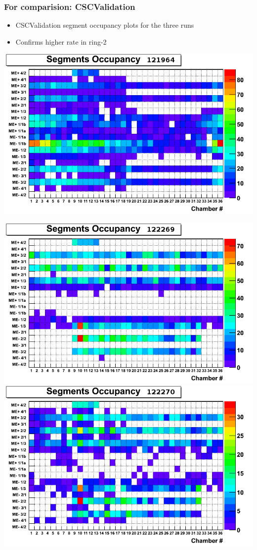 \documentclass[compress]{beamer}
\begin{document}
\begin{frame}
\frametitle{For comparision: CSCValidation}

\begin{itemize}
\item CSCValidation segment occupancy plots for the three runs
\item Confirms higher rate in ring-2
\end{itemize}

\vfill
\includegraphics[width=0.5\linewidth]{CSCValidation_segments_121964.png} 

\includegraphics[width=0.5\linewidth]{CSCValidation_segments_122269.png} \includegraphics[width=0.5\linewidth]{CSCValidation_segments_122270.png}
\end{frame}
\end{document}
